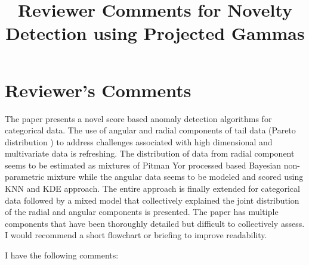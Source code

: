 \documentclass{article}
\title{Reviewer Comments for Novelty Detection using Projected Gammas}
\author{}
\date{}
\begin{document}
\section{Reviewer's Comments}
The paper presents a novel score based anomaly detection algorithms for categorical data. The use 
    of angular and radial components of tail data (Pareto distribution ) to address challenges 
    associated with high dimensional and multivariate data is refreshing. The distribution of 
    data from radial component seems to be estimated as mixtures of Pitman Yor processed based 
    Bayesian non-parametric mixture while the angular data seems to be modeled and scored using 
    KNN and KDE approach. The entire approach is finally extended for categorical data followed 
    by a mixed model that collectively explained the joint distribution of the radial and 
    angular components is presented. The paper has multiple components that have been thoroughly 
    detailed but difficult to collectively assess. I would recommend a short flowchart or 
    briefing to improve readability.

I have the following comments:
\end{document}
